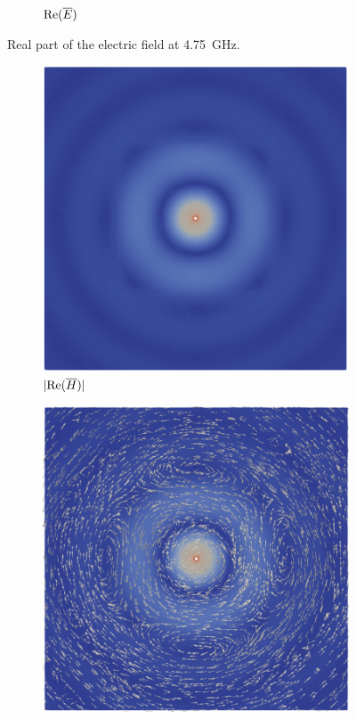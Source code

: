 \documentclass[titlepage]{article}
\renewcommand\_{\textunderscore\linebreak[1]}
\begin{document}
\begin{itemize}
\begin{figure}[H]
\begin{subfigure}{0.6\textwidth}
     \caption{$\textnormal{Re}(\overline{E})$}
  \end{subfigure}
  \caption{Real part of the electric field at 4.75~GHz.}
  \label{fig:monopole_ReE}
\end{figure}
\begin{figure}[H]
  \centering
  \begin{subfigure}{0.6\textwidth}
     \includegraphics[width=\linewidth]{../tutorials/OpenParEM3D/monopole_antenna/screenshots/Hplane_4p75GHz}
     \caption{$|\textnormal{Re}(\overline{H})|$}
  \end{subfigure}
  \par\bigskip
  \begin{subfigure}{0.6\textwidth}
     \includegraphics[width=\linewidth]{../tutorials/OpenParEM3D/monopole_antenna/screenshots/Hplane_vector_4p75GHz}

\end{subfigure}
\end{figure}
\end{itemize}
\end{document}
